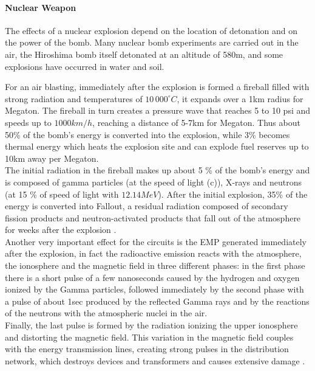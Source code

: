 {{{{				\paragraph{Nuclear Weapon}{
					The effects of a nuclear explosion depend on the location of detonation and on the power of the bomb. Many nuclear bomb experiments are carried out in the air, the Hiroshima bomb itself detonated at an altitude of 580m, and some explosions have occurred in water and soil. 
					
					For an air blasting, immediately after the explosion is formed a fireball filled with strong radiation and temperatures of $10\,000^\circ C$, it expands over a 1km radius for Megaton. The fireball in turn creates a pressure wave that reaches 5 to 10 psi and speeds up to $1000 km/h$, reaching a distance of 5-7km for Megaton. Thus about 50\% of the bomb's energy is converted into the explosion, while 3\% becomes thermal energy which heats the explosion site and can explode fuel reserves up to 10km away per Megaton.\\
					
					The initial radiation in the fireball makes up about 5 \% of the bomb's energy and is composed of gamma particles (at the speed of light (c)), X-rays and neutrons (at 15 \% of speed of light with $12.14MeV$). After the initial explosion, 35\% of the energy is converted into Fallout, a residual radiation composed of secondary fission products and neutron-activated products that fall out of the atmosphere for weeks after the explosion .\\
					
					Another very important effect for the circuits is the EMP generated immediately after the explosion, in fact the radioactive emission reacts with the atmosphere, the ionosphere and the magnetic field in three different phases: in the first phase there is a short pulse of a few nanoseconds caused by the hydrogen and oxygen ionized by the Gamma particles, followed immediately by the second phase with a pulse of about 1sec produced by the reflected Gamma rays and by the reactions of the neutrons with the atmospheric nuclei in the air. \\
					
					Finally, the last pulse is formed by the radiation ionizing the upper ionosphere and distorting the magnetic field. This variation in the magnetic field couples with the energy transmission lines, creating strong pulses in the distribution network, which destroys devices and transformers and causes extensive damage .\\
					
}}}}}
